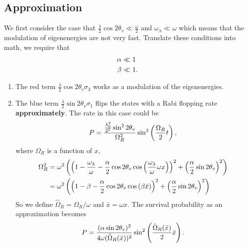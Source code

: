 \documentclass[letterpaper,12pt,english]{sphinxmanual}
\begin{document}
\subsection{Approximation}
\label{matter-driven:approximation}
We first consider the case that \(\frac{\lambda}{2} \cos 2\theta_v\ll \frac{\omega}{2}\) and \(\omega_\lambda\ll \omega\) which means that the modulation of eigenenergies are not very fast. Translate these conditions into math, we require that
\begin{gather}
\begin{split}\alpha &\ll 1\\
\beta & \ll 1.\end{split}\notag
\end{gather}\begin{enumerate}
\item {} 
The red term \(\frac{\lambda}{2} \cos 2\theta_v\sigma_3\) works as a modulation of the eigenenergies.

\item {} 
The blue term \(\frac{\lambda}{2}\sin 2\theta_v \sigma_1\) flips the states with a Rabi flopping rate \textbf{approximately}. The rate in this case could be
\begin{gather}
\begin{split}P = \frac{\frac{\lambda_0^2}{2^2} \sin^2 2\theta_v }{\Omega_R^2} \sin^2\left( \frac{\Omega_R}{2} t  \right),\end{split}\notag
\end{gather}
where \(\Omega_R\) is a function of \(x\),
\begin{gather}
\begin{split}\Omega_R^2 &= \omega^2 \left( \left(1 - \frac{\omega_\lambda}{\omega}  - \frac{\alpha}{2}\cos 2\theta_v \cos\left( \frac{\omega_\lambda}{\omega} \omega x \right) \right)^2 + \left( \frac{\alpha}{2}\sin 2\theta_v  \right)^2  \right) \\
&= \omega^2 \left( \left( 1 - \beta - \frac{\alpha}{2}\cos 2\theta_v \cos\left( \beta \bar x \right) \right)^2 + \left( \frac{\alpha}{2}\sin 2\theta_v \right)^2 \right)\end{split}\notag
\end{gather}
So we define \(\hat\Omega_R = \Omega_R/\omega\) and \(\bar x = \omega x\). The survival probability as an approximation becomes
\begin{gather}
\begin{split}P = \frac{(\alpha \sin 2\theta_v)^2}{4 \omega (\hat\Omega_R(\bar x))^2} \sin^2\left( \frac{\hat\Omega_R(\bar x)}{2} \bar x \right).\end{split}\notag
\end{gather}
\end{enumerate}
\end{document}
